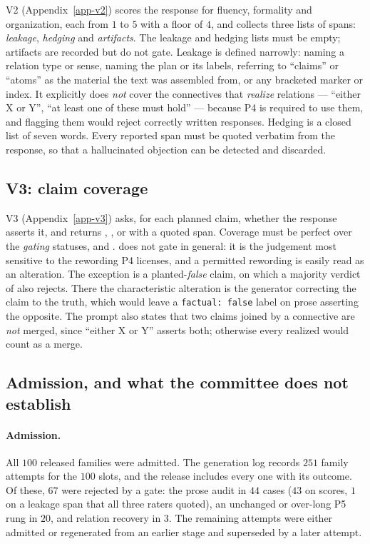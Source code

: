 V2 (Appendix~\ref{app-v2}) scores the response for fluency, formality and organization, each from $1$ to $5$
with a floor of $4$, and collects three lists of spans: \emph{leakage}, \emph{hedging} and \emph{artifacts}. The
leakage and hedging lists must be empty; artifacts are recorded but do not gate. Leakage is defined narrowly: naming
a relation type or sense, naming the plan or its labels, referring to ``claims'' or ``atoms'' as the material the
text was assembled from, or any bracketed marker or index. It explicitly does \emph{not} cover the connectives that
\emph{realize} relations --- ``either X or Y'', ``at least one of these must hold'' --- because P4 is required to use
them, and flagging them would reject correctly written responses. Hedging is a closed list of seven words. Every
reported span must be quoted verbatim from the response, so that a hallucinated objection can be detected and
discarded.

\subsection{V3: claim coverage}
\label{sec-v3}

V3 (Appendix~\ref{app-v3}) asks, for each planned claim, whether the response asserts it, and returns
, ,  or  with a quoted span. Coverage must be perfect over
the \emph{gating} statuses,  and .  does not gate in general: it is the
judgement most sensitive to the rewording P4 licenses, and a permitted rewording is easily read as an alteration.
The exception is a planted-\emph{false} claim, on which a majority verdict of  also rejects. There the
characteristic alteration is the generator correcting the claim to the truth, which would leave a
\texttt{factual: false} label on prose asserting the opposite. The prompt also states that two claims joined by a
connective are \emph{not} merged, since ``either X or Y'' asserts both; otherwise every realized
 would count as a merge.

\subsection{Admission, and what the committee does not establish}
\label{sec-committee-limits}

\paragraph{Admission.} All $100$ released families were admitted. The generation log records $251$ family attempts
for the $100$ slots, and the release includes every one with its outcome. Of these, $67$ were rejected by a gate:
the prose audit in $44$ cases ($43$ on scores, $1$ on a leakage span that all three raters quoted), an unchanged or
over-long P5 rung in $20$, and relation recovery in $3$. The remaining attempts were either admitted or regenerated
from an earlier stage and superseded by a later attempt.

